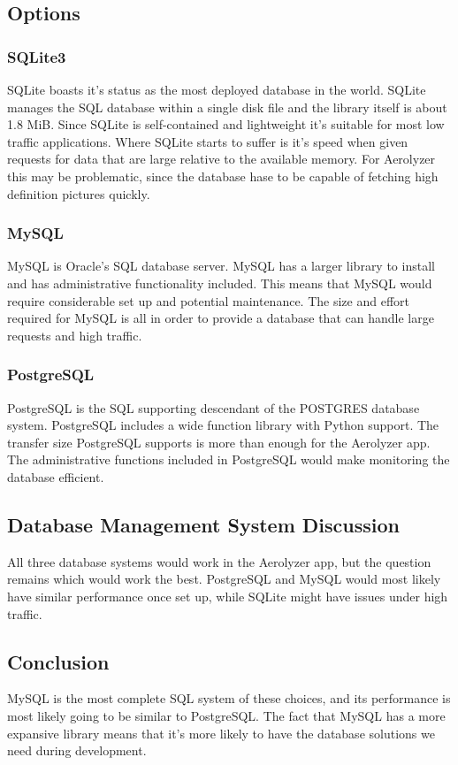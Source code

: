 \documentclass[onecolumn, draftclsnofoot,10pt, compsoc]{IEEEtran}
\begin{document}
\begin{singlespace}
\subsection{Options}
\subsubsection{SQLite3}
SQLite boasts it's status as the most deployed database in the world\cite{SQLiteAbout}.
SQLite manages the SQL database within a single disk file and the library itself is about 1.8 MiB\cite{SQLiteAbout}.
Since SQLite is self-contained and lightweight it's suitable for most low traffic applications\cite{SQLiteUse}.
Where SQLite starts to suffer is it's speed when given requests for data that are large relative to the available memory. For Aerolyzer this may be problematic, since the database hase to be capable of fetching high definition pictures quickly\cite{SQLiteAbout}.
\subsubsection{MySQL}
MySQL is Oracle's SQL database server.
MySQL has a larger library to install and has administrative functionality included.
This means that MySQL would require considerable set up and potential maintenance.
The size and effort required for MySQL is all in order to provide a database that can handle large requests and high traffic.\cite{MySQLDoc}
\subsubsection{PostgreSQL}
PostgreSQL is the SQL supporting descendant of the POSTGRES database system.
PostgreSQL includes a wide function library with Python support.
The transfer size PostgreSQL supports is more than enough for the Aerolyzer app.
The administrative functions included in PostgreSQL would make monitoring the database efficient.\cite{PostgreSQLDoc}
\subsection{Database Management System Discussion}
All three database systems would work in the Aerolyzer app, but the question remains which would work the best. PostgreSQL and MySQL would most likely have similar performance once set up, while SQLite might have issues under high traffic.
\subsection{Conclusion}
MySQL is the most complete SQL system of these choices, and its performance is most likely going to be similar to PostgreSQL.
The fact that MySQL has a more expansive library means that it's more likely to have the database solutions we need during development.



\end{singlespace}
\end{document}
